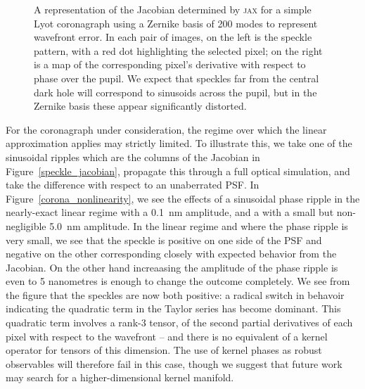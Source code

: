 \documentclass[modern]{aastex63}
\begin{document}


\begin{figure}
\caption{A representation of the Jacobian determined by \textsc{jax} for a simple Lyot coronagraph using a Zernike basis of 200 modes to represent wavefront error. In each pair of images, on the left is the speckle pattern, with a red dot highlighting the selected pixel; on the right is a map of the corresponding pixel's derivative with respect to phase over the pupil. We expect that speckles far from the central dark hole will correspond to sinusoids across the pupil, but in the Zernike basis these appear significantly distorted. \label{speckle_jacobian_zernike}}
\end{figure}

For the coronagraph under consideration, the regime over which the linear approximation applies may strictly limited. To illustrate this, we take one of the sinusoidal ripples which are the columns of the Jacobian in Figure~\ref{speckle_jacobian}, propagate this through a full optical simulation, and take the difference with respect to an unaberrated PSF. In Figure~\ref{corona_nonlinearity}, we see the effects of a sinusoidal phase ripple in the nearly-exact linear regime with a 0.1~nm amplitude, and a with a small but non-negligible 5.0~nm amplitude. In the linear regime and where the phase ripple is very small, we see that the speckle is positive on one side of the PSF and negative on the other corresponding closely with expected behavior from the Jacobian. On the other hand increaasing the amplitude of the phase ripple is even to  5 nanometres is enough to change the outcome completely. We see from the figure that the speckles are now both positive: a radical switch in behavoir indicating the quadratic term in the Taylor series has become dominant. This quadratic term involves a rank-3 tensor, of the second partial derivatives of each pixel with respect to the wavefront -- and there is no equivalent of a kernel operator for tensors of this dimension. The use of kernel phases as robust observables will therefore fail in this case, though we suggest that future work may search for a higher-dimensional kernel manifold. 
\end{document}
